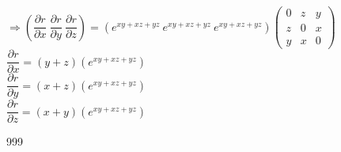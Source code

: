 \documentclass[a4paper]{article}
\begin{document}
$\Rightarrow \left(\dfrac{\partial r}{\partial x} \ \dfrac{\partial r}{\partial y} \ \dfrac{\partial r}{\partial z}\right)= \left(e^{xy+xz+yz} \ e^{xy+xz+yz} \ e^{xy+xz+yz}\right)
\left(\begin{array}{ccc}
0 & z & y \\
z & 0 & x \\
y & x & 0
\end{array}\right)$ \\

$\dfrac{\partial r}{\partial x} = (y+z)(e^{xy+xz+yz})$ \\

$\dfrac{\partial r}{\partial y} = (x+z)(e^{xy+xz+yz})$ \\

$\dfrac{\partial r}{\partial z} = (x+y)(e^{xy+xz+yz})$ \\







\begin{thebibliography}{999}
\end{thebibliography}
\end{document}
